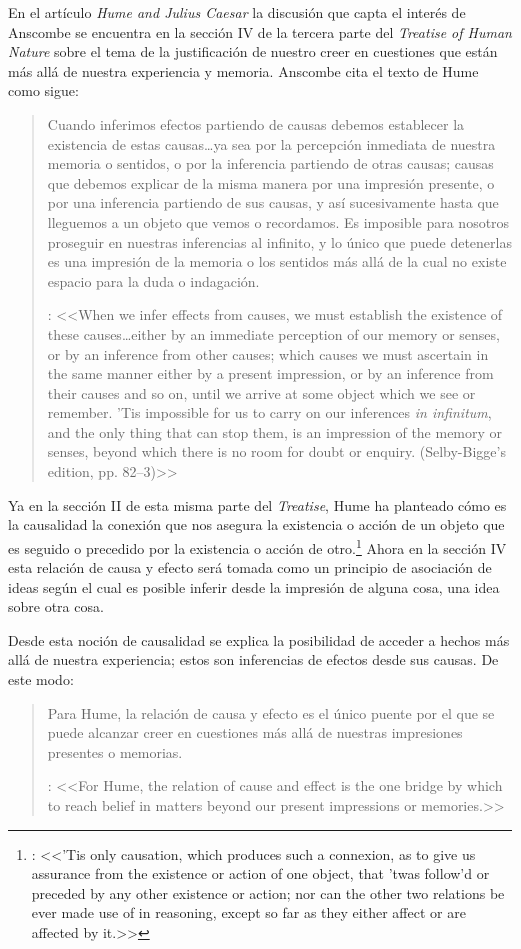 En el artículo \emph{Hume and Julius Caesar} la discusión que capta el interés de Anscombe se encuentra en la sección IV de la tercera parte del \emph{Treatise of Human Nature} sobre el tema de la justificación de nuestro creer en cuestiones que están más allá de nuestra experiencia y memoria. Anscombe cita el texto de Hume como sigue: \blockquote[{\cite[86]{anscombe1981parmenides:humeandjulius}}: <<When we infer effects from causes, we must establish the existence of these causes\ldots either by an immediate perception of our memory or senses, or by an inference from other causes; which causes we must ascertain in the same manner either by a present impression, or by an inference from their causes and so on, until we arrive at some object which we see or remember. 'Tis impossible for us to carry on our inferences \emph{in infinitum}, and the only thing that can stop them, is an impression of the memory or senses, beyond which there is no room for doubt or enquiry. (Selby-Bigge's edition, pp. 82--3)>>]{Cuando inferimos efectos partiendo de causas debemos establecer la existencia de estas causas\ldots ya sea por la percepción inmediata de nuestra memoria o sentidos, o por la inferencia partiendo de otras causas; causas que debemos explicar de la misma manera por una impresión presente, o por una inferencia partiendo de sus causas, y así sucesivamente hasta que lleguemos a un objeto que vemos o recordamos. Es imposible para nosotros proseguir en nuestras inferencias al infinito, y lo único que puede detenerlas es una impresión de la memoria o los sentidos más allá de la cual no existe espacio para la duda o indagación.}

Ya en la sección II de esta misma parte del \emph{Treatise}, Hume ha planteado cómo es la causalidad la conexión que nos asegura la existencia o acción de un objeto que es seguido o precedido por la existencia o acción de otro.\footnote{\cite[Cf.~][53]{hume1740treatise}: <<’Tis only causation, which produces such a connexion, as to give us assurance from the existence or action of one object, that ’twas follow’d or preceded by any other existence or action; nor can the other two relations be ever made use of in reasoning, except so far as they either affect or are affected by it.>>} Ahora en la sección IV esta relación de causa y efecto será tomada como un principio de asociación de ideas según el cual es posible inferir desde la impresión de alguna cosa, una idea sobre otra cosa.

Desde esta noción de causalidad se explica la posibilidad de acceder a hechos más allá de nuestra experiencia; estos son inferencias de efectos desde sus causas. De este modo: \blockquote[{\cite[87]{anscombe1981parmenides:humeandjulius}}: <<For Hume, the relation of cause and effect is the one bridge by which to reach belief in matters beyond our present impressions or memories.>>]{Para Hume, la relación de causa y efecto es el único puente por el que se puede alcanzar creer en cuestiones más allá de nuestras impresiones presentes o memorias.}

